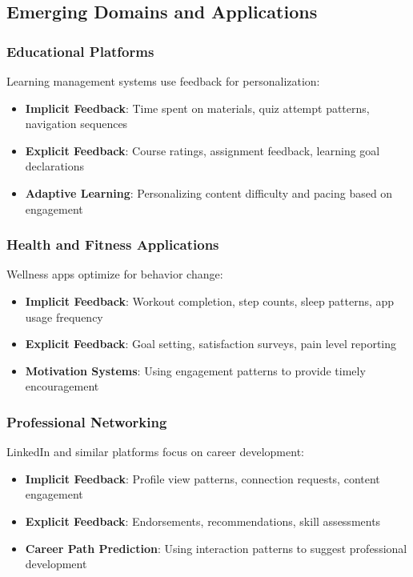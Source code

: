 \documentclass[acmsmall,review,anonymous]{acmart}
\begin{document}
\subsection{Emerging Domains and Applications}

\subsubsection{Educational Platforms}

Learning management systems use feedback for personalization:

\begin{itemize}
    \item \textbf{Implicit Feedback}: Time spent on materials, quiz attempt patterns, navigation sequences
    \item \textbf{Explicit Feedback}: Course ratings, assignment feedback, learning goal declarations
    \item \textbf{Adaptive Learning}: Personalizing content difficulty and pacing based on engagement
\end{itemize}

\subsubsection{Health and Fitness Applications}

Wellness apps optimize for behavior change:

\begin{itemize}
    \item \textbf{Implicit Feedback}: Workout completion, step counts, sleep patterns, app usage frequency
    \item \textbf{Explicit Feedback}: Goal setting, satisfaction surveys, pain level reporting
    \item \textbf{Motivation Systems}: Using engagement patterns to provide timely encouragement
\end{itemize}

\subsubsection{Professional Networking}

LinkedIn and similar platforms focus on career development:

\begin{itemize}
    \item \textbf{Implicit Feedback}: Profile view patterns, connection requests, content engagement
    \item \textbf{Explicit Feedback}: Endorsements, recommendations, skill assessments
    \item \textbf{Career Path Prediction}: Using interaction patterns to suggest professional development
\end{itemize}
\end{document}
